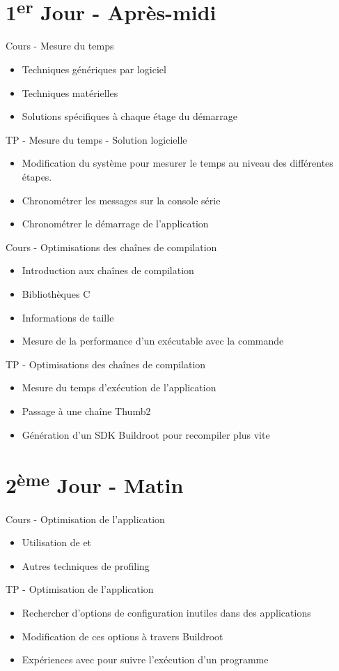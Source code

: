 \documentclass[a4paper,12pt,obeyspaces,spaces,hyphens]{article}
\begin{document}
\section{1\textsuperscript{er} Jour - Après-midi}

\feagendatwocolumn
{Cours - Mesure du temps}
{
  \begin{itemize}
  \item Techniques génériques par logiciel
  \item Techniques matérielles
  \item Solutions spécifiques à chaque étage du démarrage
  \end{itemize}
}
{TP - Mesure du temps - Solution logicielle}
{
 \begin{itemize}
 \item Modification du système pour mesurer le temps au niveau des différentes étapes.
 \item Chronométrer les messages sur la console série
 \item Chronométrer le démarrage de l'application
 \end{itemize}
}

\feagendaonecolumn
{Cours - Optimisations des chaînes de compilation}
{
  \begin{itemize}
  \item Introduction aux chaînes de compilation
  \item Bibliothèques C
  \item Informations de taille
  \item Mesure de la performance d'un exécutable avec la commande 
  \end{itemize}
}

\feagendaonecolumn
{TP - Optimisations des chaînes de compilation}
{
  \begin{itemize}
  \item Mesure du temps d'exécution de l'application
  \item Passage à une chaîne Thumb2
  \item Génération d'un SDK Buildroot pour recompiler plus vite
  \end{itemize}
}

\section{2\textsuperscript{ème} Jour - Matin}

\feagendatwocolumn
{Cours - Optimisation de l'application}
{
  \begin{itemize}
  \item Utilisation de  et 
  \item Autres techniques de profiling
  \end{itemize}
}
{TP - Optimisation de l'application}
{
 \begin{itemize}
 \item Rechercher d'options de configuration inutiles dans des applications
 \item Modification de ces options à travers Buildroot
 \item Expériences avec  pour suivre l'exécution d'un programme
 \end{itemize}
}
\end{document}
